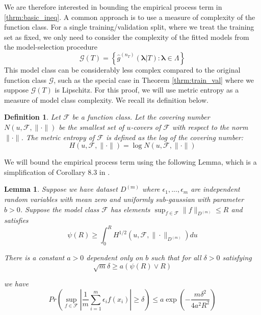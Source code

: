 \documentclass[12pt]{article}
\newtheorem{lemma}{Lemma}
\newtheorem{definition}{Definition}
\begin{document}
We are therefore interested in bounding the empirical process term in \eqref{thrm:basic_ineq}. A common approach is to use a measure of complexity of the function class. For a single training/validation split, where we treat the training set as fixed, we only need to consider the complexity of the fitted models from the model-selection procedure
\begin{equation}
\mathcal{G}(T)=\left\{ \hat{g}^{(n_T)}(\boldsymbol{\lambda}|T) : \boldsymbol{\lambda} \in \Lambda \right\}
\end{equation}
This model class can be considerably less complex compared to the original function class $\mathcal{G}$, such as the special case in Theorem \ref{thrm:train_val} where we suppose $\mathcal{G}(T)$ is Lipschitz. For this proof, we will use metric entropy as a measure of model class complexity. We recall its definition below.
\begin{definition}
	Let $\mathcal{F}$ be a function class. Let the covering number $N(u, \mathcal{F}, \| \cdot \|)$ be the smallest set of $u$-covers of $\mathcal{F}$ with respect to the norm $\| \cdot \|$. The metric entropy of $\mathcal{F}$ is defined as the log of the covering number:
\begin{equation}
H (u, \mathcal{F}, \| \cdot \| ) = \log N(u, \mathcal{F}, \| \cdot \|)
\end{equation}
\end{definition}

We will bound the empirical process term using the following Lemma, which is a simplification of Corollary 8.3 in \citet{van2000empirical}.

\begin{lemma}
	\label{lemma:cor83}
	Suppose we have dataset $D^{(m)}$ where $\epsilon_1,...,\epsilon_m$ are independent random variables with mean zero and uniformly sub-gaussian with parameter $b > 0$. Suppose
	the model class $\mathcal{F}$ has elements $\sup_{f\in\mathcal{F}}\|f\|_{D^{(m)}}\le R$
	and satisfies
	\[
	\psi(R)\ge\int_{0}^{R}H^{1/2}(u,\mathcal{F},\|\cdot\|_{D^{(m)}})du
	\]
	
	
	There is a constant $a > 0$ dependent only on $b$ such that
	for all $\delta>0$ satisfying
	\[
	\sqrt{m}\delta\ge a(\psi(R)\vee R)
	\]
	
	
	we have 
	\[
	Pr\left(\sup_{f\in\mathcal{F}}\left|\frac{1}{m}\sum_{i=1}^{m}\epsilon_{i}f(x_{i})\right|\ge\delta\right)
	\le 
	a\exp\left(-\frac{m\delta^{2}}{4a^{2}R^{2}}\right)
	\]
	
\end{lemma}
\end{document}
